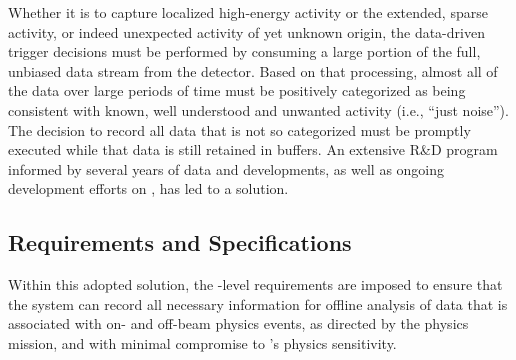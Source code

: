 Whether it is to capture localized high-energy activity or the extended,
sparse  activity, or indeed unexpected activity of yet unknown
origin, the data-driven trigger decisions must be performed by consuming
a large portion of the full, unbiased data stream from the detector. 
Based on that processing, almost all of 
the data over large periods of time must be
positively categorized as being consistent with known, well understood
and unwanted activity (i.e., ``just noise''). 
The decision to record all data that is not so categorized must be
promptly executed while that data is still retained in buffers.
An extensive R\&D program informed by several years of \microboone data
and  developments, as well as ongoing development efforts on
, has led to a solution. %

\subsection{Requirements and Specifications}
\label{sec:fd-daq:specifications}

Within %
this adopted solution, the -level requirements are
imposed to ensure that the 
system %
can record all necessary information for offline 
analysis of data that is associated with on- and off-beam physics events, as directed
by the  physics mission, and with minimal compromise to
's physics sensitivity.




